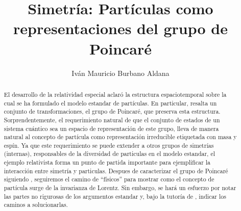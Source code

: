 \documentclass[11pt]{article}
\title{Simetría: Partículas como representaciones del grupo de Poincaré}
\author{Iván Mauricio Burbano Aldana}
\affil{Universidad de los Andes}
\begin{document}
\maketitle

\begin{abstract}
El desarrollo de la relatividad especial aclaró la estructura espaciotemporal sobre la cual se ha formulado el modelo estandar de partículas. En particular, resalta un conjunto de transformaciones, el grupo de Poincaré, que preserva esta estructura. Sorprendentemente, el requerimiento natural de que el conjunto de estados de un sistema cuántico sea un espacio de representación de este grupo, lleva de manera natural al concepto de partícula como representación irreducible etiquetada con masa y espín\cite{Wigner1939}. Ya que este requerimiento se puede extender a otros grupos de simetrías (internas), responsables de la diversidad de particulas en el modelo estandar, el ejemplo relativista forma un punto de partida importante para ejemplificar la interacción entre simetría y particulas. Despues de caracterizar el grupo de Poincaré siguiendo \cite{Scheck2010}, seguiremos el camino de ``físicos''\cite{Haag1992}\cite{Weinberg1995} para mostrar como el concepto de partícula surge de la invarianza de Lorentz. Sin embargo, se hará un esfuerzo por notar las partes no rigurosas de los argumentos estandar y, bajo la tutoría de \cite{Straumann2008}, indicar los caminos a solucionarlas.  
\end{abstract}



\end{document}
